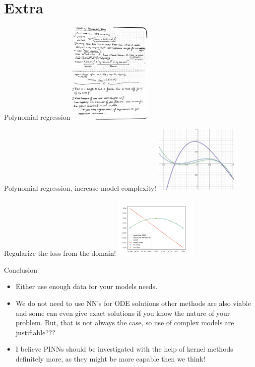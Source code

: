 \documentclass[aspectratio=169]{beamer}
\begin{document}
\section{Extra}
\begin{frame}{Polynomial regression}
  \centering
    \includegraphics[width=0.3\textwidth]{pinnpoly.pdf}
\end{frame}

\begin{frame}{Polynomial regression, increase model complexity!}
  \centering
    \includegraphics[width=0.3\textwidth]{models.png}
\end{frame}

\begin{frame}{Regularize the loss from the domain!}
  \centering
    \includegraphics[width=0.3\textwidth]{pinn-3.pdf}
\end{frame}

\begin{frame}{Conclusion}
  \centering
  \begin{itemize}
    \item Either use enough data for your models needs.
    \item We do not need to use NN's for ODE solutions other methods are also viable and some can even give exact solutions if you know the nature of your problem. But, that is not always the case, so use of complex models are justifiable???
    \item I believe PINNs should be investigated with the help of kernel methods definitely more, as they might be more capable then we think!
  \end{itemize}
\end{frame}
\end{document}
